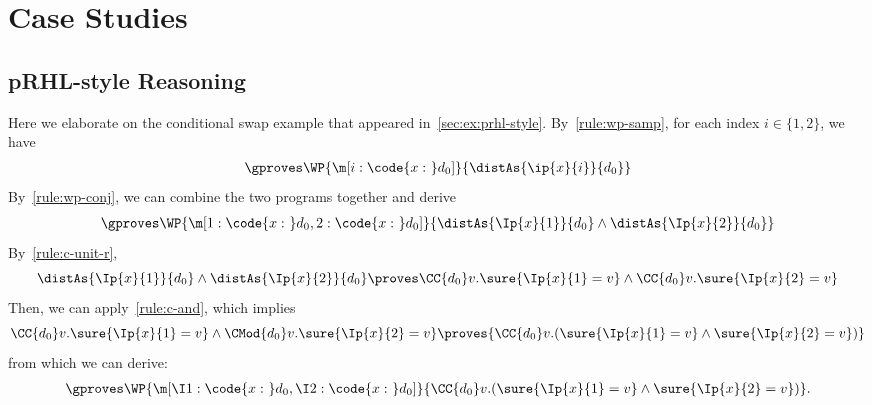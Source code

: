
\section{Case Studies}
\label{sec:appendix:examples}


\subsection{pRHL-style Reasoning}
\label{sec:appendix:ex:prhl}

Here we elaborate on the conditional swap example that appeared in~\cref{sec:ex:prhl-style}.
By~\cref{rule:wp-samp}, for each index $i \in \{1, 2\}$, we have
\begin{align*}
  \gproves \WP{\m[i: \code{x:~}d_0]}{\distAs{\ip{x}{i}}{d_0}}
\end{align*}
By~\cref{rule:wp-conj}, we can combine the two programs together and derive
\begin{align*}
  \gproves \WP{\m[1: \code{x:~}d_0, 2: \code{x:~}d_0]}{\distAs{\Ip{x}{1}}{d_0} \land \distAs{\Ip{x}{2}}{d_0}}
\end{align*}
By~\cref{rule:c-unit-r},
\[\distAs{\Ip{x}{1}}{d_0} \land \distAs{\Ip{x}{2}}{d_0} \proves
  \CC{d_0} v. \sure{\Ip{x}{1} = v} \land  \CC{d_0} v. \sure{\Ip{x}{2} = v}
\]
Then, we can apply~\cref{rule:c-and}, which implies
\[
  \CC{d_0} v. \sure{\Ip{x}{1} = v} \land  \CMod{d_0} v. \sure{\Ip{x}{2} = v}
  \proves
  {\CC{d_0} v. (\sure{\Ip{x}{1} = v} \land  \sure{\Ip{x}{2} = v})}
\]
from which we can derive:
\begin{align*}
  \gproves \WP{\m[\I1: \code{x:~}d_0, \I2: \code{x:~}d_0]}{\CC{d_0} v.(\sure{\Ip{x}{1}=v} \land \sure{\Ip{x}{2}=v})}.
\end{align*}

